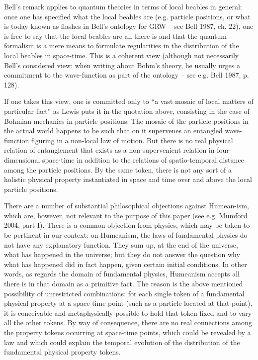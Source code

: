 \documentclass[12pt,a4paper]{article}
\theoremstyle{definition}
\begin{document}
\noindent Bell's remark applies to quantum theories in terms of local beables in general: once one has specified what the local beables are (e.g. particle positions, or what is today known as flashes in Bell's ontology for GRW -- see Bell 1987, ch. 22), one is free to say that the local beables are all there is and that the quantum formalism is a mere means to formulate regularities in the distribution of the local beables in space-time. This is a coherent view (although not necessarily Bell's considered view: when writing about Bohm's theory, he usually urges a commitment to the wave-function as part of the ontology  -- see e.g. Bell 1987, p. 128).

If one takes this view, one is committed only to ``a vast mosaic of local matters of particular fact'' as Lewis puts it in the quotation above, consisting in the case of Bohmian mechanics in particle positions. The mosaic of the particle positions in the actual world happens to be such that on it supervenes an entangled wave-function figuring in a non-local law of motion. But there is no real physical relation of entanglement that exists as a non-supervenient relation in four-dimensional space-time in addition to the relations of spatio-temporal distance among the particle positions. By the same token, there is not any sort of a holistic physical property instantiated in space and time over and above the local particle positions.

There are a number of substantial philosophical objections against 
Humean-ism, which are, however, not relevant to the purpose of this paper (see e.g. Mumford 2004, part I). There is a common objection from physics, which may be taken to be pertinent in our context: on Humeanism, the laws of fundamental physics do not have any explanatory function. They sum up, at the end of the universe, what has happened in the universe; but they do not answer the question why what has happened did in fact happen, given certain initial conditions. In other words, as regards the domain of fundamental physics, Humeanism accepts all there is in that domain as a primitive fact. The reason is the above mentioned possibility of unrestricted combinations: for each single token of a fundamental physical property at a space-time point (such as a particle located at that point), it is conceivable and metaphysically possible to hold that token fixed and to vary all the other tokens. By way of consequence, there are no real connections among the property tokens occurring at space-time points, which could be revealed by a law and which could explain the temporal evolution of the distribution of the fundamental physical property tokens.
\end{document}

